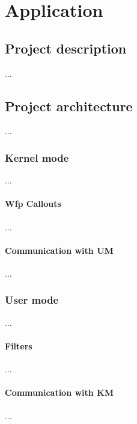 \chapter{Application}
\section{Project description}
...
\section{Project architecture}
...
\subsection{Kernel mode}
...
\subsubsection{Wfp Callouts}
...
\subsubsection{Communication with UM}
...
\subsection{User mode}
...
\subsubsection{Filters}
...
\subsubsection{Communication with KM}
...